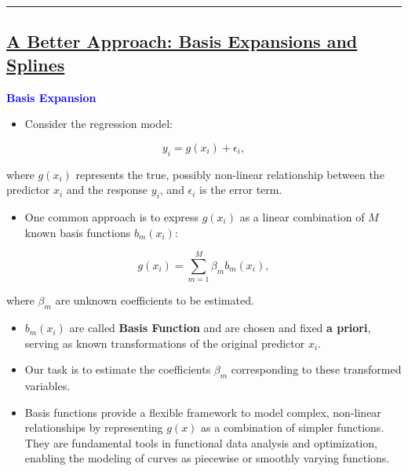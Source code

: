\documentclass[
  letterpaper,
  DIV=11,
  numbers=noendperiod]{scrreprt}
\providecommand{\tightlist}{%
  \setlength{\itemsep}{0pt}\setlength{\parskip}{0pt}}\usepackage{longtable,booktabs,array}
\begin{document}
\begin{center}\rule{0.5\linewidth}{0.5pt}\end{center}

\hypertarget{a-better-approach-basis-expansions-and-splines}{%
\subsection*{\texorpdfstring{\ul{A Better Approach: Basis Expansions and
Splines}}{A Better Approach: Basis Expansions and Splines}}\label{a-better-approach-basis-expansions-and-splines}}

\textbf{\textcolor{blue}{Basis Expansion}}

\begin{itemize}
\tightlist
\item
  Consider the regression model:
\end{itemize}

\[
y_i = g(x_i) + \epsilon_i,
\]

where \(g(x_i)\) represents the true, possibly non-linear relationship
between the predictor \(x_i\) and the response \(y_i\), and
\(\epsilon_i\) is the error term.

\begin{itemize}
\tightlist
\item
  One common approach is to express \(g(x_i)\) as a linear combination
  of \(M\) known basis functions \(b_m(x_i)\):
\end{itemize}

\[
g(x_i) = \sum_{m=1}^M \beta_m b_m(x_i),
\]

where \(\beta_m\) are unknown coefficients to be estimated.

\begin{itemize}
\item
  \(b_m(x_i)\) are called \textbf{Basis Function} and are chosen and
  fixed \textbf{a priori}, serving as known transformations of the
  original predictor \(x_i\).
\item
  Our task is to estimate the coefficients \(\beta_m\) corresponding to
  these transformed variables.
\item
  Basis functions provide a flexible framework to model complex,
  non-linear relationships by representing \(g(x)\) as a combination of
  simpler functions. They are fundamental tools in functional data
  analysis and optimization, enabling the modeling of curves as
  piecewise or smoothly varying functions.
\end{itemize}
\end{document}

